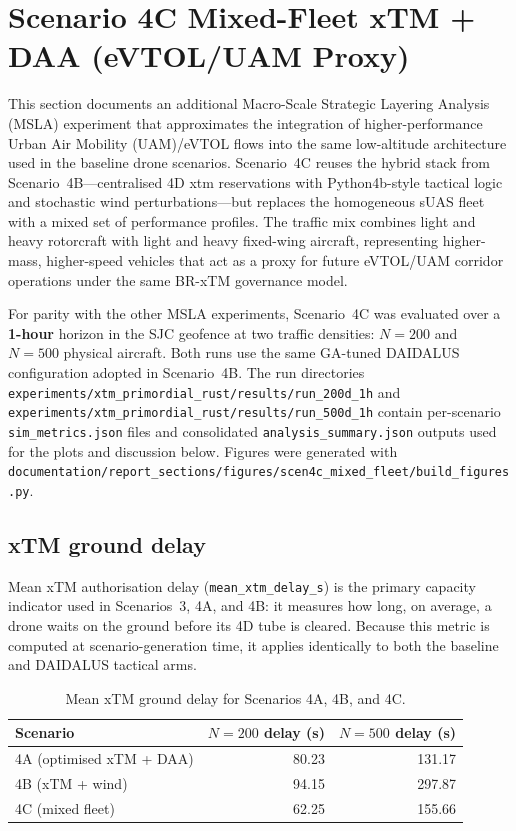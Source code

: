 \section{Scenario 4C Mixed-Fleet xTM + DAA (eVTOL/UAM Proxy)}
\label{sec:scen4c_mixed_fleet}

This section documents an additional Macro-Scale Strategic Layering Analysis (MSLA) experiment
that approximates the integration of higher-performance Urban Air Mobility (UAM)/eVTOL flows
into the same low-altitude architecture used in the baseline drone scenarios. Scenario~4C reuses
the hybrid stack from Scenario~4B---centralised 4D \gls{xtm} reservations with Python4b-style
tactical logic and stochastic wind perturbations---but replaces the homogeneous sUAS fleet with
a mixed set of performance profiles. The traffic mix combines light and heavy rotorcraft with
light and heavy fixed-wing aircraft, representing higher-mass, higher-speed vehicles that act
as a proxy for future eVTOL/UAM corridor operations under the same BR-xTM governance model.

For parity with the other MSLA experiments, Scenario~4C was evaluated over a \textbf{1-hour}
horizon in the SJC geofence at two traffic densities: \textbf{$N=200$} and \textbf{$N=500$}
physical aircraft. Both runs use the same GA-tuned DAIDALUS configuration adopted in
Scenario~4B. The run directories
\texttt{experiments/xtm\_primordial\_rust/results/run\_200d\_1h} and
\texttt{experiments/xtm\_primordial\_rust/results/run\_500d\_1h} contain per-scenario
\texttt{sim\_metrics.json} files and consolidated \texttt{analysis\_summary.json} outputs used
for the plots and discussion below. Figures were generated with
\texttt{documentation/report\_sections/figures/scen4c\_mixed\_fleet/build\_figures.py}.

\subsection{xTM ground delay}

Mean xTM authorisation delay (\texttt{mean\_xtm\_delay\_s}) is the primary capacity indicator
used in Scenarios~3, 4A, and 4B: it measures how long, on average, a drone waits on the ground
before its 4D tube is cleared. Because this metric is computed at scenario-generation time, it
applies identically to both the baseline and DAIDALUS tactical arms.

\begin{table}[htbp]
\caption{Mean xTM ground delay for Scenarios 4A, 4B, and 4C.}
\label{tab:scen4c_delay}
\begin{center}
\begin{tabular}{|l|r|r|}
\hline
\textbf{Scenario} & \textbf{$N=200$ delay (s)} & \textbf{$N=500$ delay (s)} \\
\hline
4A (optimised xTM + DAA)  & 80.23  & 131.17 \\
4B (xTM + wind)           & 94.15  & 297.87 \\
4C (mixed fleet)          & 62.25  & 155.66 \\
\hline
\end{tabular}
\end{center}
\end{table}


